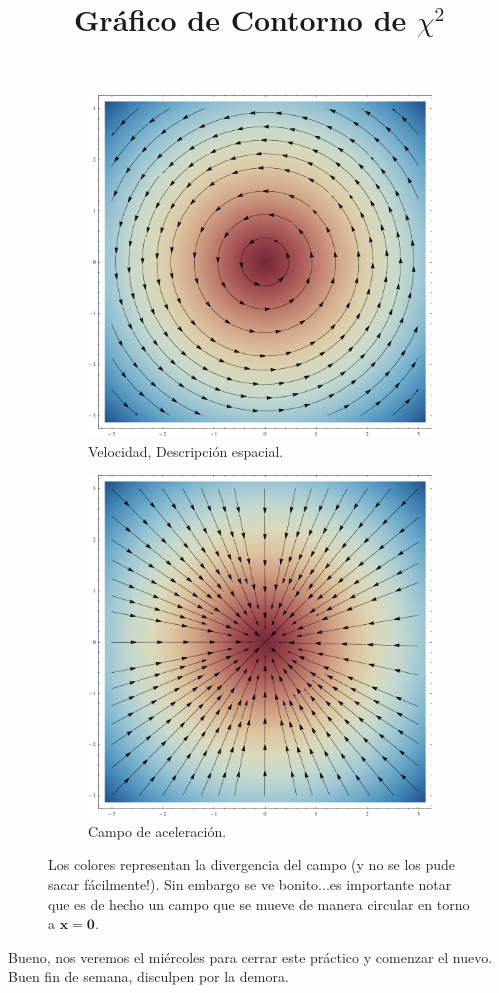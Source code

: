 \documentclass[10pt,a4paper]{article}
\begin{document}
\begin{figure}[h!]
\begin{subfigure}{.50\textwidth}
  \centering
 \title{Gráfico de Contorno de $\chi^2$}  
  \includegraphics[width=1\linewidth]{vel6.pdf}
  \caption{Velocidad, Descripción espacial.}
  \label{gconto}
\end{subfigure}%
\begin{subfigure}{.50\textwidth}
\title{} 
  \centering
   \includegraphics[width=1\linewidth]{acel6.pdf}
  \caption{Campo de aceleración.}
  \label{gtresd}
\end{subfigure}
\caption{Los colores representan la divergencia del campo  (y no se los pude sacar fácilmente!). Sin embargo se ve bonito...es importante notar que es de hecho un campo que se mueve de manera circular en torno a $\mathbf{x = \mathbf{0}}$.}
\end{figure}

Bueno, nos veremos el miércoles para cerrar este práctico y comenzar el nuevo. Buen fin de semana, disculpen por la demora.
\end{document}
